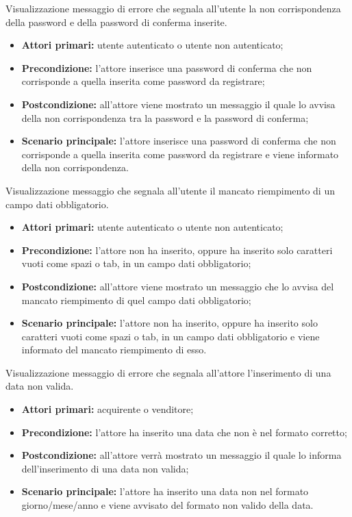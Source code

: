 \hypertarget{PasswordsDiverse}{}
Visualizzazione messaggio di errore che segnala all'utente la non corrispondenza della password e della password di conferma inserite.
\begin{itemize}
    \item \textbf{Attori primari:} utente autenticato o utente non autenticato;
    \item \textbf{Precondizione:} l'attore inserisce una password di conferma che non corrisponde a quella inserita come password da registrare;
    \item \textbf{Postcondizione:} all'attore viene mostrato un messaggio il quale lo avvisa della non corrispondenza tra la password e la password di conferma;
    \item \textbf{Scenario principale:} l'attore inserisce una password di conferma che non corrisponde a quella inserita come password da registrare e viene informato della non corrispondenza.
\end{itemize}

\hypertarget{CampoObbligatorio}{}
Visualizzazione messaggio che segnala all'utente il mancato riempimento di un campo dati obbligatorio.
\begin{itemize}
    \item \textbf{Attori primari:} utente autenticato o utente non autenticato;
    \item \textbf{Precondizione:} l'attore non ha inserito, oppure ha inserito solo caratteri vuoti come spazi o tab, in un campo dati obbligatorio;
    \item \textbf{Postcondizione:} all'attore viene mostrato un messaggio che lo avvisa del mancato riempimento di quel campo dati obbligatorio;
    \item \textbf{Scenario principale:} l'attore non ha inserito, oppure ha inserito solo caratteri vuoti come spazi o tab, in un campo dati obbligatorio e viene informato del mancato riempimento di esso.
\end{itemize}

\hypertarget{DataInvalida}{}
Visualizzazione messaggio di errore che segnala all'attore l'inserimento di una data non valida.
\begin{itemize}
    \item \textbf{Attori primari:} acquirente o venditore;
    \item \textbf{Precondizione:} l'attore ha inserito una data che non è nel formato corretto;
    \item \textbf{Postcondizione:} all'attore verrà mostrato un messaggio il quale lo informa dell'inserimento di una data non valida;
    \item \textbf{Scenario principale:} l'attore ha inserito una data non nel formato giorno/mese/anno e viene avvisato del formato non valido della data.
\end{itemize}

